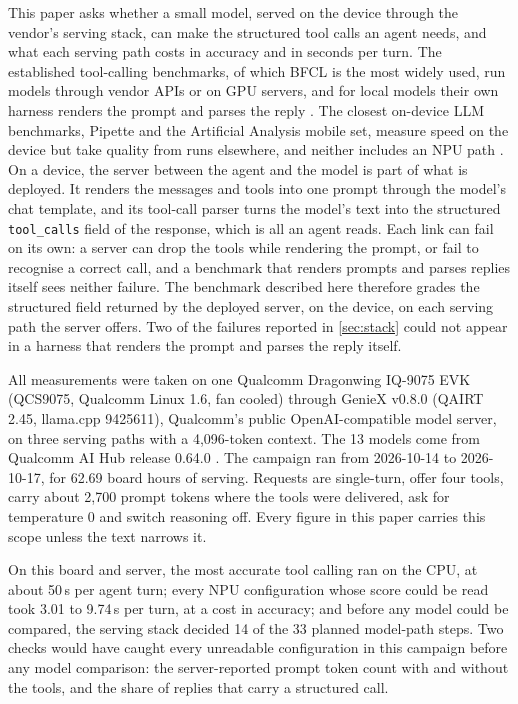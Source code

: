 \documentclass[11pt]{article}
\begin{document}
This paper asks whether a small model, served on the device through the vendor's serving stack, can make the structured tool calls an agent needs, and what each serving path costs in accuracy and in seconds per turn. The established tool-calling benchmarks, of which BFCL is the most widely used, run models through vendor APIs or on GPU servers, and for local models their own harness renders the prompt and parses the reply \citep{bfcl2025,bfclLeaderboard}. The closest on-device LLM benchmarks, Pipette and the Artificial Analysis mobile set, measure speed on the device but take quality from runs elsewhere, and neither includes an NPU path \citep{pipette,aaMobile}. On a device, the server between the agent and the model is part of what is deployed. It renders the messages and tools into one prompt through the model's chat template, and its tool-call parser turns the model's text into the structured \texttt{tool\_calls} field of the response, which is all an agent reads. Each link can fail on its own: a server can drop the tools while rendering the prompt, or fail to recognise a correct call, and a benchmark that renders prompts and parses replies itself sees neither failure. The benchmark described here therefore grades the structured field returned by the deployed server, on the device, on each serving path the server offers. Two of the failures reported in \cref{sec:stack} could not appear in a harness that renders the prompt and parses the reply itself.

All measurements were taken on one Qualcomm Dragonwing IQ-9075 EVK \citep{qcomIQ9075brief} (QCS9075, Qualcomm Linux 1.6, fan cooled) through GenieX v0.8.0 \citep{geniex2026} (QAIRT 2.45, llama.cpp 9425611), Qualcomm's public OpenAI-compatible model server, on three serving paths with a 4,096-token context. The 13 models come from Qualcomm AI Hub release 0.64.0 \citep{aihubmodels}. The campaign ran from 2026-10-14 to 2026-10-17, for 62.69 board hours of serving. Requests are single-turn, offer four tools, carry about 2,700 prompt tokens where the tools were delivered, ask for temperature 0 and switch reasoning off. Every figure in this paper carries this scope unless the text narrows it.

On this board and server, the most accurate tool calling ran on the CPU, at about 50\,s per agent turn; every NPU configuration whose score could be read took 3.01 to 9.74\,s per turn, at a cost in accuracy; and before any model could be compared, the serving stack decided 14 of the 33 planned model-path steps. Two checks would have caught every unreadable configuration in this campaign before any model comparison: the server-reported prompt token count with and without the tools, and the share of replies that carry a structured call.
\end{document}
